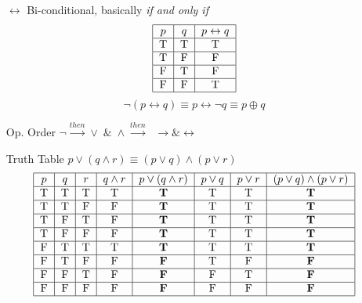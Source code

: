 \documentclass[12pt]{book}
\begin{document}
\begin{enumerate}
    \item[$\leftrightarrow$] Bi-conditional, basically \textit{if and only if}
    \[
    \begin{tabular}{|c|c|c|}
        \hline
        $p$ & $q$ & $p \leftrightarrow q$\\
        \hline
        T&T&T\\
        \hline
        T&F&F\\
        \hline
        F&T&F\\
        \hline
        F&F&T\\
        \hline
    \end{tabular}
    \]
    \[
    \neg (p \leftrightarrow q) \equiv p \leftrightarrow \neg q \equiv p \oplus q
    \]
    

    \item[Op. Order] $\neg \xrightarrow{then} \vee \; \& \; \wedge \xrightarrow{then}\;\; \rightarrow \& \leftrightarrow$

    \item[Truth Table] $p\vee (q \wedge r) \equiv (p\vee q)\wedge(p \vee r)$
        \[
            \begin{tabular}{|c|c|c|c|c|c|c|c|}
            \hline
            $p$ & $q$ & $r$ & $q \wedge r$ & $p \vee (q \wedge r)$ & $p \vee q$ & $p \vee r$ & $(p \vee q) \wedge (p \vee r)$\\
            \hline
            T&T&T&T&\textbf{T}&T&T&\textbf{T}\\
            \hline
            T&T&F&F&\textbf{T}&T&T&\textbf{T}\\
            \hline
            T&F&T&F&\textbf{T}&T&T&\textbf{T}\\
            \hline
            T&F&F&F&\textbf{T}&T&T&\textbf{T}\\
            \hline
            F&T&T&T&\textbf{T}&T&T&\textbf{T}\\
            \hline
            F&T&F&F&\textbf{F}&T&F&\textbf{F}\\
            \hline
            F&F&T&F&\textbf{F}&F&T&\textbf{F}\\
            \hline
            F&F&F&F&\textbf{F}&F&F&\textbf{F}\\
            \hline
            \end{tabular}
        \]
    
\end{enumerate}


\newpage
\end{document}
